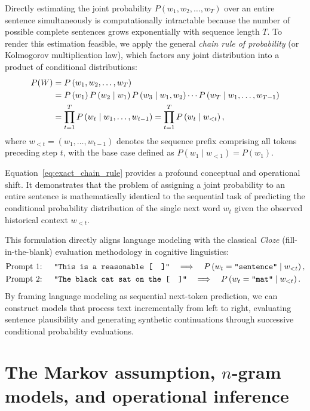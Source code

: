 \documentclass[../../../main.tex]{subfiles}
\begin{document}
Directly estimating the joint probability $P(w_1, w_2, \dots, w_T)$ over an entire sentence simultaneously is computationally intractable because the number of possible complete sentences grows exponentially with sequence length $T$. To render this estimation feasible, we apply the general \textit{chain rule of probability} (or Kolmogorov multiplication law), which factors any joint distribution into a product of conditional distributions:
\begin{align}
P(W) &= P\left(w_1, w_2, \dots, w_T\right) \notag \\
&= P\left(w_1\right) P\left(w_2 \mid w_1\right) P\left(w_3 \mid w_1, w_2\right) \cdots P\left(w_T \mid w_1, \dots, w_{T-1}\right) \notag \\
&= \prod_{t=1}^T P\left(w_t \mid w_1, \dots, w_{t-1}\right) = \prod_{t=1}^T P\left(w_t \mid w_{<t}\right),
\label{eq:exact_chain_rule}
\end{align}
where $w_{<t} = (w_1, \dots, w_{t-1})$ denotes the sequence prefix comprising all tokens preceding step $t$, with the base case defined as $P(w_1 \mid w_{<1}) = P(w_1)$.

Equation~\eqref{eq:exact_chain_rule} provides a profound conceptual and operational shift. It demonstrates that the problem of assigning a joint probability to an entire sentence is mathematically identical to the sequential task of predicting the conditional probability distribution of the single next word $w_t$ given the observed historical context $w_{<t}$.

This formulation directly aligns language modeling with the classical \textit{Cloze} (fill-in-the-blank) evaluation methodology in cognitive linguistics:
\begin{align}
\text{Prompt 1: } & \quad \texttt{"This is a reasonable [\quad]"} \quad \Longrightarrow \quad P\left(w_t = \texttt{"sentence"} \mid w_{<t}\right), \\
\text{Prompt 2: } & \quad \texttt{"The black cat sat on the [\quad]"} \quad \Longrightarrow \quad P\left(w_t = \texttt{"mat"} \mid w_{<t}\right).
\end{align}
By framing language modeling as sequential next-token prediction, we can construct models that process text incrementally from left to right, evaluating sentence plausibility and generating synthetic continuations through successive conditional probability evaluations.

\clearpage
\section{The Markov assumption, $n$-gram models, and operational inference}
\label{sec:markov_ngrams_inference}
\end{document}
